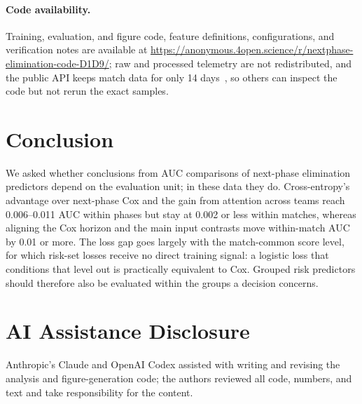 \documentclass[sigconf,anonymous]{acmart}
\newcommand{\artifacturl}{\url{https://anonymous.4open.science/r/nextphase-elimination-code-D1D9/}}
\begin{document}
\paragraph{Code availability.}
Training, evaluation, and figure code, feature definitions, configurations, and verification notes are available at \artifacturl{}; raw and processed telemetry are not redistributed, and the public API keeps match data for only 14 days~\cite{PUBGAPI}, so others can inspect the code but not rerun the exact samples.

\section{Conclusion}
\label{sec:conclusion}
We asked whether conclusions from AUC comparisons of next-phase elimination predictors depend on the evaluation unit; in these data they do. Cross-entropy's advantage over next-phase Cox and the gain from attention across teams reach 0.006--0.011 AUC within phases but stay at 0.002 or less within matches, whereas aligning the Cox horizon and the main input contrasts move within-match AUC by 0.01 or more. The loss gap goes largely with the match-common score level, for which risk-set losses receive no direct training signal: a logistic loss that conditions that level out is practically equivalent to Cox. Grouped risk predictors should therefore also be evaluated within the groups a decision concerns.

\section*{AI Assistance Disclosure}
Anthropic's Claude and OpenAI Codex assisted with writing and revising the analysis and figure-generation code; the authors reviewed all code, numbers, and text and take responsibility for the content.



\end{document}
